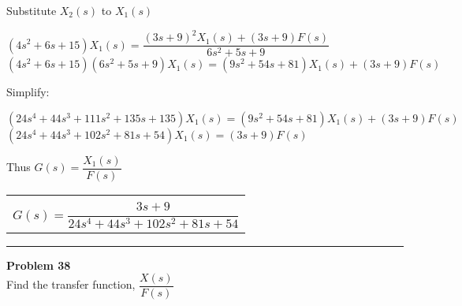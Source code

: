\documentclass[11pt,letterpaper]{article}
\begin{document}
Substitute $X_2(s)$ to $X_1(s)$\\
\begin{center}
	$(4s^2+6s+15)X_1(s)=\dfrac{(3s+9)^2X_1(s)+(3s+9)F(s)}{6s^2+5s+9}$\\[12pt]
	$(4s^2+6s+15)(6s^2+5s+9)X_1(s)=(9s^2+54s+81)X_1(s)+(3s+9)F(s)$\\
\end{center}
Simplify:\\
\begin{center}
	$(24s^4+44s^3+111s^2+135s+135)X_1(s)=(9s^2+54s+81)X_1(s)+(3s+9)F(s)$\\[12pt]
	$(24s^4+44s^3+102s^2+81s+54)X_1(s)=(3s+9)F(s)$\\
\end{center}
Thus $G(s)=\dfrac{X_1(s)}{F(s)}$\\
\begin{center}
	\begin{tabular}{|c|}
		\hline \\
		$G(s)=\dfrac{3s+9}{24s^4+44s^3+102s^2+81s+54}$	\\ [12pt]
	\hline
	\end{tabular}	
\end{center}

\clearpage

\rule{\textwidth}{1pt}
\textbf{Problem 38}\\
Find the transfer function, $\dfrac{X(s)}{F(s)}$ \\
\end{document}
